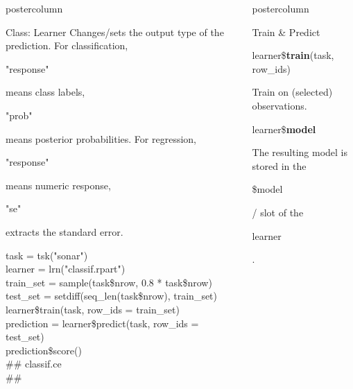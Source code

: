 \documentclass{beamer}
\newlength{\columnheight} %
\newcommand{\codeinline}[1]{\begin{codeboxinline}#1\end{codeboxinline}}
\begin{document}
\begin{frame}[fragile]{}
\begin{columns}
\begin{column}{.245\textwidth}
\begin{beamercolorbox}[center]{postercolumn}
\begin{minipage}{.98\textwidth}
{\begin{myblock}{Class: Learner}
							Changes/sets the output type of the prediction. For classification, \codeinline{"response"} means class labels, \codeinline{"prob"} means posterior probabilities.
							For regression, \codeinline{"response"} means numeric response,
							\codeinline{"se"} extracts the standard error.
							\vspace{1em}
							\begin{codeboxexample}
								{\scriptsize
									task = tsk("sonar")\\
									learner = lrn("classif.rpart")
									\vspace{1em}
									\\
									train\_set = sample(task\$nrow, 0.8 * task\$nrow)\\
									test\_set = setdiff(seq\_len(task\$nrow), train\_set)
									\vspace{1em}
									\\
									learner\$train(task, row\_ids = train\_set)
									\vspace{1em}
									\\
									prediction = learner\$predict(task, row\_ids = test\_set)\\
									prediction\$score()\\
									\#\# classif.ce\\
									\#\# }
							\end{codeboxexample}
						\end{myblock}
						\vfill}
				\end{minipage}
			\end{beamercolorbox}
		\end{column}
		\begin{column}{.245\textwidth}
			\begin{beamercolorbox}[center]{postercolumn}
				\begin{minipage}{.98\textwidth}
					\parbox[t][\columnheight]{\textwidth}{
						\begin{myblock}{Train \& Predict}
							\vspace{0.25em}
							\begin{codebox}
								learner\$\textbf{train}(task, row\_ids)
							\end{codebox}
							Train on (selected) observations.
							\\
							\begin{codebox}
								learner\$\textbf{model}
							\end{codebox}
							The resulting model is stored in the \codeinline{\$model}/ slot of the \codeinline{learner}.

\end{myblock}}
\end{minipage}
\end{beamercolorbox}
\end{column}
\end{columns}
\end{frame}
\end{document}
